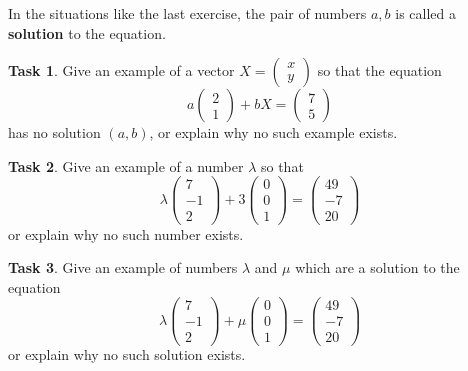 \documentclass[10pt,]{book}
\newcommand{\terminology}[1]{\textbf{#1}}
\theoremstyle{plain}
\theoremstyle{definition}
\numberwithin{equation}{section}
\newtheorem{task}{Task}[chapter]
\begin{document}
In the situations like the last exercise, the pair of numbers \(a, b\) is called a \terminology{solution} to the equation.%
\begin{task}
\label{task-5}
Give an example of a vector \(X = \left( \begin{smallmatrix} x \\ y \end{smallmatrix} \right)\) so that the equation \[a \begin{pmatrix} 2 \\ 1 \end{pmatrix} + b X = \begin{pmatrix}7 \\ 5 \end{pmatrix} \] has no solution \((a,b)\), or explain why no such example exists.%
\end{task}
\begin{task}
\label{task-6}
Give an example of a number \(\lambda\) so that \[\lambda \begin{pmatrix} 7 \\ -1 \\ 2 \end{pmatrix} + 3 \begin{pmatrix} 0 \\ 0 \\ 1 \end{pmatrix} = \begin{pmatrix} 49 \\ -7 \\ 20 \end{pmatrix}\] or explain why no such number exists.%
\end{task}
\begin{task}
\label{task-7}
Give an example of numbers \(\lambda\) and \(\mu\) which are a solution to the equation \[ \lambda \begin{pmatrix} 7 \\ -1 \\ 2 \end{pmatrix} + \mu \begin{pmatrix} 0 \\ 0 \\ 1 \end{pmatrix} = \begin{pmatrix} 49 \\ -7 \\ 20 \end{pmatrix}\] or explain why no such solution exists.%
\end{task}
\end{document}

